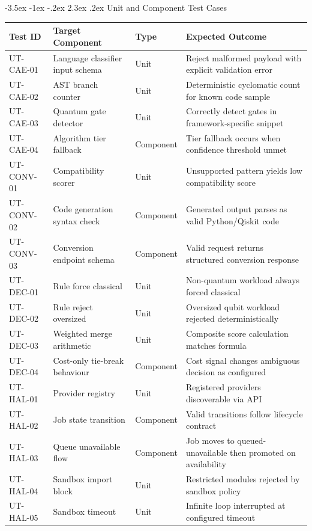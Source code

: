 \documentclass[12pt,a4paper]{report}
\makeatletter
\renewcommand\section{\@startsection{section}{1}{\z@}%
  {-3.5ex \@plus -1ex \@minus -.2ex}%
  {2.3ex \@plus.2ex}%
  {\normalfont\bfseries\fontsize{12pt}{16pt}\selectfont}}
\makeatother
\begin{document}
\section{Unit and Component Test Cases}
\small
\begin{longtable}{p{}p{}p{}p{}}
\toprule
\textbf{Test ID} & \textbf{Target Component} & \textbf{Type} & \textbf{Expected Outcome} \\
\midrule
UT-CAE-01 & Language classifier input schema & Unit & Reject malformed payload with explicit validation error \\
UT-CAE-02 & AST branch counter & Unit & Deterministic cyclomatic count for known code sample \\
UT-CAE-03 & Quantum gate detector & Unit & Correctly detect gates in framework-specific snippet \\
UT-CAE-04 & Algorithm tier fallback & Component & Tier fallback occurs when confidence threshold unmet \\
UT-CONV-01 & Compatibility scorer & Unit & Unsupported pattern yields low compatibility score \\
UT-CONV-02 & Code generation syntax check & Component & Generated output parses as valid Python/Qiskit code \\
UT-CONV-03 & Conversion endpoint schema & Component & Valid request returns structured conversion response \\
UT-DEC-01 & Rule force classical & Unit & Non-quantum workload always forced classical \\
UT-DEC-02 & Rule reject oversized & Unit & Oversized qubit workload rejected deterministically \\
UT-DEC-03 & Weighted merge arithmetic & Unit & Composite score calculation matches formula \\
UT-DEC-04 & Cost-only tie-break behaviour & Component & Cost signal changes ambiguous decision as configured \\
UT-HAL-01 & Provider registry & Unit & Registered providers discoverable via API \\
UT-HAL-02 & Job state transition & Component & Valid transitions follow lifecycle contract \\
UT-HAL-03 & Queue unavailable flow & Component & Job moves to queued-unavailable then promoted on availability \\
UT-HAL-04 & Sandbox import block & Unit & Restricted modules rejected by sandbox policy \\
UT-HAL-05 & Sandbox timeout & Unit & Infinite loop interrupted at configured timeout \\

\end{longtable}
\end{document}
